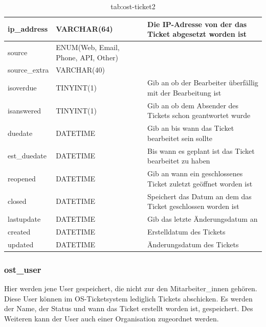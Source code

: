 \begin{table}[h]
	\begin{tabular}{|p{3.5cm}|p{4cm}|p{6.2cm}|}
		\hline
		ip\_address & VARCHAR(64) & Die IP-Adresse von der das Ticket abgesetzt worden ist \\
		\hline
			
		source & ENUM(Web, Email, Phone, API, Other) &\\
		\hline
		source\_extra & VARCHAR(40)&\\
		\hline
		isoverdue & TINYINT(1) & Gib an ob der Bearbeiter überfällig mit der Bearbeitung ist\\
		\hline
		isanswered & TINYINT(1) & Gib an ob dem Absender des Tickets schon geantwortet wurde\\
		\hline
		duedate & DATETIME & Gib an bis wann das Ticket bearbeitet sein sollte\\
		\hline
		est\_duedate & DATETIME & Bis wann es geplant ist das Ticket bearbeitet zu haben \\
		\hline
		reopened & DATETIME & Gib an wann ein geschlossenes Ticket zuletzt geöffnet worden ist \\
		\hline
		closed & DATETIME & Speichert das Datum an dem das Ticket geschlossen worden ist \\
		\hline
		lastupdate & DATETIME & Gib das letzte Änderungsdatum an \\
		\hline
		created & DATETIME & Erstelldatum des Tickets\\
		\hline
		updated & DATETIME & Änderungsdatum des Tickets\\
		\hline
	\end{tabular}
	\caption{tab:ost-ticket2}
\end{table}
\label{tab:ost_ticket2}

\newpage


\subsubsection{ost\_user}

Hier werden jene User gespeichert, die nicht zur den Mitarbeiter\_innen gehören. Diese User können im OS-Ticketsystem lediglich Tickets abschicken. Es werden der Name, der Status und wann das Ticket erstellt worden ist, gespeichert. Des Weiteren kann der User auch einer Organisation zugeordnet werden.

